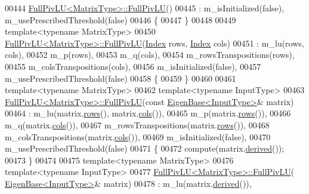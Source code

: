 \begin{DoxyCode}
00444 \hyperlink{group___l_u___module_af225528d1c6e623a2b1dce091907d13e}{FullPivLU<MatrixType>::FullPivLU}()
00445   : m\_isInitialized(\textcolor{keyword}{false}), m\_usePrescribedThreshold(\textcolor{keyword}{false})
00446 \{
00447 \}
00448 
00449 \textcolor{keyword}{template}<\textcolor{keyword}{typename} MatrixType>
00450 \hyperlink{group___l_u___module_af225528d1c6e623a2b1dce091907d13e}{FullPivLU<MatrixType>::FullPivLU}(\hyperlink{group___core___module_a554f30542cc2316add4b1ea0a492ff02}{Index} rows, 
      \hyperlink{group___core___module_a554f30542cc2316add4b1ea0a492ff02}{Index} cols)
00451   : m\_lu(rows, cols),
00452     m\_p(rows),
00453     m\_q(cols),
00454     m\_rowsTranspositions(rows),
00455     m\_colsTranspositions(cols),
00456     m\_isInitialized(\textcolor{keyword}{false}),
00457     m\_usePrescribedThreshold(\textcolor{keyword}{false})
00458 \{
00459 \}
00460 
00461 \textcolor{keyword}{template}<\textcolor{keyword}{typename} MatrixType>
00462 \textcolor{keyword}{template}<\textcolor{keyword}{typename} InputType>
00463 \hyperlink{group___l_u___module_af225528d1c6e623a2b1dce091907d13e}{FullPivLU<MatrixType>::FullPivLU}(\textcolor{keyword}{const} 
      \hyperlink{group___core___module_struct_eigen_1_1_eigen_base}{EigenBase<InputType>}& matrix)
00464   : m\_lu(matrix.\hyperlink{group___core___module_a8141320ba8df384426c298b32b000d8e}{rows}(), matrix.\hyperlink{group___core___module_a7b0b45c7351847696c911ce8aa2abbdb}{cols}()),
00465     m\_p(matrix.\hyperlink{group___core___module_a8141320ba8df384426c298b32b000d8e}{rows}()),
00466     m\_q(matrix.\hyperlink{group___core___module_a7b0b45c7351847696c911ce8aa2abbdb}{cols}()),
00467     m\_rowsTranspositions(matrix.\hyperlink{group___core___module_a8141320ba8df384426c298b32b000d8e}{rows}()),
00468     m\_colsTranspositions(matrix.\hyperlink{group___core___module_a7b0b45c7351847696c911ce8aa2abbdb}{cols}()),
00469     m\_isInitialized(\textcolor{keyword}{false}),
00470     m\_usePrescribedThreshold(\textcolor{keyword}{false})
00471 \{
00472   compute(matrix.\hyperlink{group___core___module_a324b16961a11d2ecfd2d1b7dd7946545}{derived}());
00473 \}
00474 
00475 \textcolor{keyword}{template}<\textcolor{keyword}{typename} MatrixType>
00476 \textcolor{keyword}{template}<\textcolor{keyword}{typename} InputType>
00477 \hyperlink{group___l_u___module_af225528d1c6e623a2b1dce091907d13e}{FullPivLU<MatrixType>::FullPivLU}(
      \hyperlink{group___core___module_struct_eigen_1_1_eigen_base}{EigenBase<InputType>}& matrix)
00478   : m\_lu(matrix.\hyperlink{group___core___module_a324b16961a11d2ecfd2d1b7dd7946545}{derived}()),

\end{DoxyCode}
